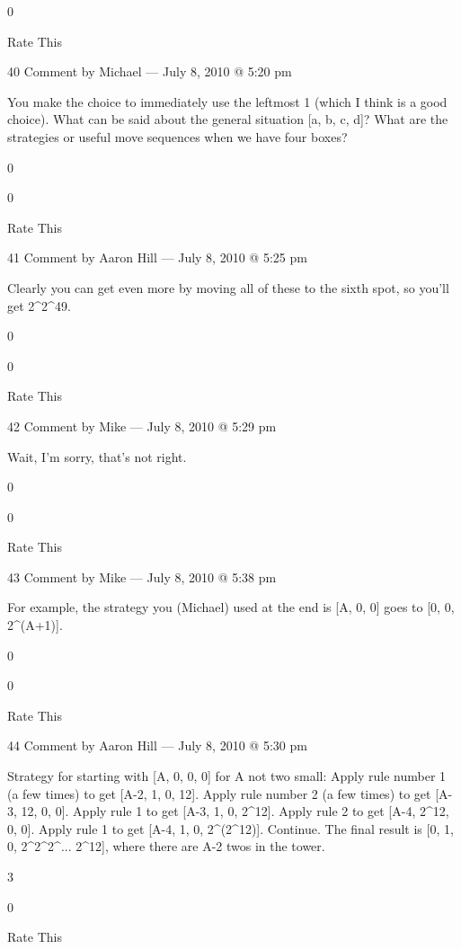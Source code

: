     0
     
    Rate This

    40 Comment by Michael — July 8, 2010 @ 5:20 pm

        You make the choice to immediately use the leftmost 1 (which I think is a good choice). What can be said about the general situation [a, b, c, d]? What are the strategies or useful move sequences when we have four boxes?
         
        0
         
        0
         
        Rate This

        41 Comment by Aaron Hill — July 8, 2010 @ 5:25 pm

        Clearly you can get even more by moving all of these to the sixth spot, so you’ll get 2^2^49.
         
        0
         
        0
         
        Rate This

        42 Comment by Mike — July 8, 2010 @ 5:29 pm

            Wait, I’m sorry, that’s not right.
             
            0
             
            0
             
            Rate This

            43 Comment by Mike — July 8, 2010 @ 5:38 pm

        For example, the strategy you (Michael) used at the end is [A, 0, 0] goes to [0, 0, 2^(A+1)].
         
        0
         
        0
         
        Rate This

        44 Comment by Aaron Hill — July 8, 2010 @ 5:30 pm

        Strategy for starting with [A, 0, 0, 0] for A not two small: Apply rule number 1 (a few times) to get [A-2, 1, 0, 12]. Apply rule number 2 (a few times) to get [A-3, 12, 0, 0]. Apply rule 1 to get [A-3, 1, 0, 2^12]. Apply rule 2 to get [A-4, 2^12, 0, 0]. Apply rule 1 to get [A-4, 1, 0, 2^(2^12)]. Continue. The final result is [0, 1, 0, 2^2^2^... 2^12], where there are A-2 twos in the tower.
         
        3
         
        0
         
        Rate This

